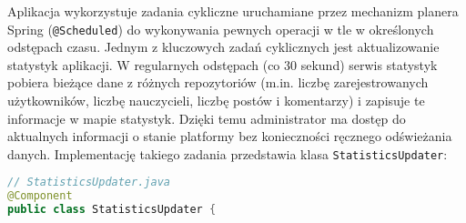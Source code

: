 Aplikacja wykorzystuje zadania cykliczne uruchamiane przez mechanizm
planera Spring (\texttt{@Scheduled}) do wykonywania pewnych operacji w tle
w określonych odstępach czasu. Jednym z kluczowych zadań cyklicznych jest
aktualizowanie statystyk aplikacji. W regularnych odstępach (co 30 sekund)
serwis statystyk pobiera bieżące dane z różnych repozytoriów (m.in. liczbę
zarejestrowanych użytkowników, liczbę nauczycieli, liczbę postów i komentarzy)
i zapisuje te informacje w mapie statystyk. Dzięki temu administrator ma dostęp
do aktualnych informacji o stanie platformy bez konieczności ręcznego
odświeżania danych. Implementację takiego zadania przedstawia klasa
\texttt{StatisticsUpdater}:
\begin{lstlisting}[language=Java,
  caption={kod aktualizowania statystyk. Źródło: opracowanie własne},
  label={lst:statisticUpdater},
  captionpos=b]
// StatisticsUpdater.java
@Component
public class StatisticsUpdater {


\end{lstlisting}
